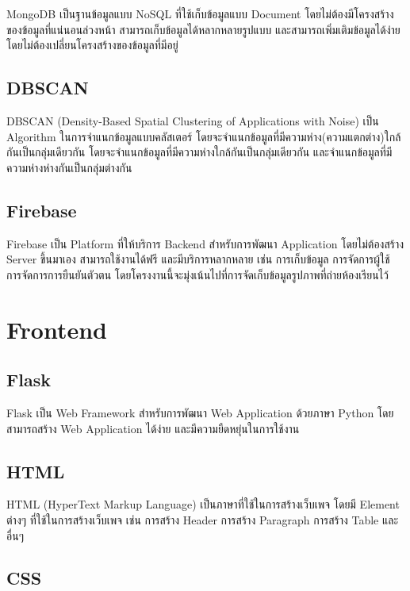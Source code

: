 MongoDB เป็นฐานข้อมูลแบบ NoSQL ที่ใช้เก็บข้อมูลแบบ Document โดยไม่ต้องมีโครงสร้างของข้อมูลที่แน่นอนล่วงหน้า สามารถเก็บข้อมูลได้หลากหลายรูปแบบ และสามารถเพิ่มเติมข้อมูลได้ง่าย โดยไม่ต้องเปลี่ยนโครงสร้างของข้อมูลที่มีอยู่ \cite{website:mongodb}

\subsection{DBSCAN}

DBSCAN (Density-Based Spatial Clustering of Applications with Noise) เป็น Algorithm ในการจำแนกข้อมูลแบบคลัสเตอร์ โดยจะจำแนกข้อมูลที่มีความห่าง(ความแตกต่าง)ใกล้กันเป็นกลุ่มเดียวกัน
\enskip โดยจะจำแนกข้อมูลที่มีความห่างใกล้กันเป็นกลุ่มเดียวกัน และจำแนกข้อมูลที่มีความห่างห่างกันเป็นกลุ่มต่างกัน \cite{website:dbscan}

\subsection{Firebase}

Firebase เป็น Platform ที่ให้บริการ Backend สำหรับการพัฒนา Application โดยไม่ต้องสร้าง Server ขึ้นมาเอง สามารถใช้งานได้ฟรี และมีบริการหลากหลาย เช่น การเก็บข้อมูล การจัดการผู้ใช้ การจัดการการยืนยันตัวตน
\enskip โดยโครงงานนี้จะมุ่งเน้นไปที่การจัดเก็บข้อมูลรูปภาพที่ถ่ายห้องเรียนไว้ \cite{website:firebase}

\section{Frontend}

\subsection{Flask}

Flask เป็น Web Framework สำหรับการพัฒนา Web Application ด้วยภาษา Python โดยสามารถสร้าง Web Application ได้ง่าย และมีความยืดหยุ่นในการใช้งาน \cite{website:flask}

\subsection{HTML}

HTML (HyperText Markup Language) เป็นภาษาที่ใช้ในการสร้างเว็บเพจ โดยมี Element ต่างๆ ที่ใช้ในการสร้างเว็บเพจ เช่น การสร้าง Header การสร้าง Paragraph การสร้าง Table และอื่นๆ \cite{website:html}

\subsection{CSS}

